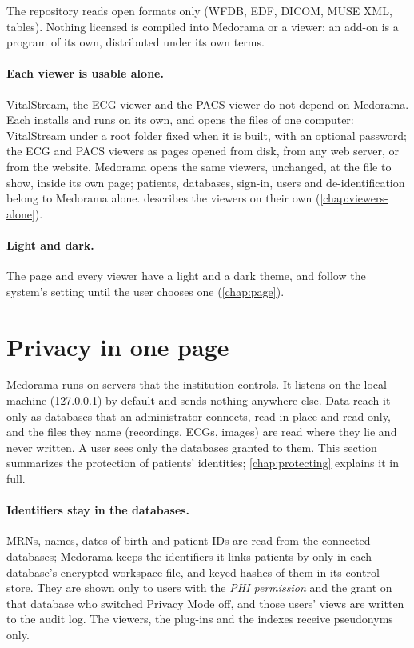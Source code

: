 The repository reads open formats only (WFDB, EDF, DICOM, MUSE XML, tables). Nothing licensed is
compiled into Medorama or a viewer: an add-on is a program of its own, distributed under its
own terms.

\paragraph{Each viewer is usable alone.} VitalStream, the ECG viewer and the PACS viewer do not
depend on Medorama. Each installs and runs on its own, and opens the files of one computer:
VitalStream under a root folder fixed when it is built, with an optional password; the ECG and
PACS viewers as pages opened from disk, from any web server, or from the website. Medorama
opens the same viewers, unchanged, at the file to show, inside its own page; patients,
databases, sign-in, users and de-identification belong to Medorama alone.
 describes the viewers on their own (\cref{chap:viewers-alone}).

\paragraph{Light and dark.} The page and every viewer have a light and a dark theme, and follow
the system's setting until the user chooses one (\cref{chap:page}).

\section{Privacy in one page}
\label{sec:introduction-privacy}

Medorama runs on servers that the institution controls. It listens on the local machine
(127.0.0.1) by default and sends nothing anywhere else. Data reach it only as databases that an
administrator connects, read in place and read-only, and the files they name (recordings, ECGs,
images) are read where they lie and never written. A user sees only the databases granted to
them. This
section summarizes the protection of patients' identities; \cref{chap:protecting} explains it in
full.

\paragraph{Identifiers stay in the databases.} MRNs, names, dates of birth and patient IDs are
read from the connected databases; Medorama keeps the identifiers it links patients by only in
each database's encrypted workspace file, and keyed hashes of them in its control store. They
are shown only to users with the \emph{PHI permission} and the  grant on that
database who switched Privacy Mode off, and those users' views are written to the audit log.
The viewers, the plug-ins and the indexes receive pseudonyms only.

